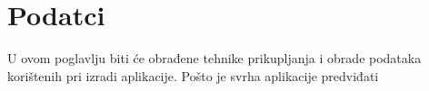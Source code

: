 \chapter{Podatci}

U ovom poglavlju biti će obrađene tehnike prikupljanja i obrade podataka korištenih pri izradi aplikacije. Pošto je svrha aplikacije predviđati 